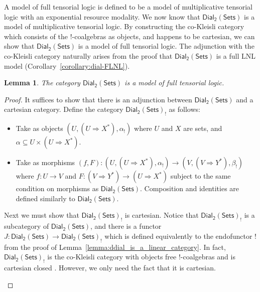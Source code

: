 \documentclass{elsarticle}
\newcommand{\dial}[0]{\mathsf{Dial_2}(\mathsf{Sets})}
\newtheorem{lemma}[theorem]{Lemma}
\begin{document}
A model of full tensorial logic is defined to be a model of
multiplicative tensorial logic with an exponential resource
modality. We now know that $\dial$ is a model of multiplicative
tensorial logic.  By constructing the co-Kleisli category which
consists of the $!$-coalgebras as objects, and happens to be
cartesian, we can show that $\dial$ is a model of full tensorial
logic.  The adjunction with the co-Kleisli category naturally arises
from the proof that $\dial$ is a full LNL model
(Corollary~\ref{corollary:dial-FLNL}).
\begin{lemma}
  \label{lemma:full-tensorial-logic}
  The category $\dial$ is a model of full tensorial logic.
\end{lemma}
\begin{proof}
    It suffices to show that there is an adjunction between $\dial$ and
  a cartesian category.  Define the category $\dial_!$ as follows:
  \begin{itemize}
  \item Take as objects $(U , (U \Rightarrow X^*), \alpha_!)$
    where $U$ and $X$ are sets, and $\alpha \subseteq U \times (U \Rightarrow X^*)$.
    
  \item Take as morphisms $(f , F) : (U , (U \Rightarrow X^*),
    \alpha_!) \to (V , (V \Rightarrow Y^*), \beta_!)$ where $f : U \to
    V$ and $F : (V \Rightarrow Y^*) \to (U \Rightarrow X^*)$ subject
    to the same condition on morphisms as $\dial$.  Composition and
    identities are defined similarly to $\dial$.
  \end{itemize}
  \begin{paper}
    
    Next we must show that $\dial_!$ is cartesian.  Notice that
    $\dial_!$ is a subcategory of $\dial$, and there is a functor $J :
    \dial \to \dial_!$ which is defined equivalently to the endofunctor
    $!$ from the proof of Lemma~\ref{lemma:ddial_is_a_linear_category}.
    In fact, $\dial_!$ is the co-Kleisli category with objects free
    !-coalgebras and is cartesian closed \cite{dePaiva:1987}.  However,
    we only need the fact that it is cartesian.
    

\end{paper}
\end{proof}
\end{document}
